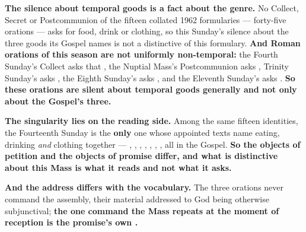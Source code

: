 \textbf{The silence about temporal goods is a fact about the genre.} No Collect,
Secret or Postcommunion of the fifteen collated 1962 formularies --- forty-five
orations --- asks for food, drink or clothing, so
this Sunday's silence about the three goods its Gospel names is not a
distinctive of this formulary. \textbf{And Roman orations of this season are not
uniformly non-temporal:} the Fourth Sunday's Collect asks that , the Nuptial Mass's Postcommunion
asks , Trinity Sunday's asks , the Eighth Sunday's asks , and the
Eleventh Sunday's asks .
\textbf{So these orations are silent about temporal goods generally and not only
about the Gospel's three.}

\textbf{The singularity lies on the reading side.} Among the same fifteen
identities, the Fourteenth Sunday is the \textbf{only} one whose appointed texts
name eating, drinking \emph{and} clothing together --- ,
, , , ,
, , all in the Gospel. \textbf{So the
objects of petition and the objects of promise differ, and what is distinctive
about this Mass is what it reads and not what it asks.}

\textbf{And the address differs with the vocabulary.} The three orations never
command the assembly, their material addressed to God being otherwise
subjunctival; \textbf{the one command the Mass repeats at the moment of
reception is the promise's own .}

